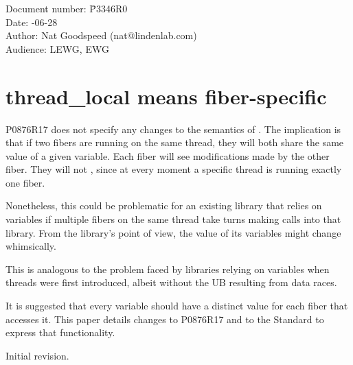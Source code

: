\documentclass[fontsize=10pt,paper=A4,pagesize,DIV=15]{scrartcl}
\begin{document}
\small
\begin{tabbing}
    Document number: \= P3346R0\\
    Date:            -06-28\\
    Author:          \> Nat Goodspeed (nat@lindenlab.com)\\
    Audience:        \> LEWG, EWG\\
\end{tabbing}

\section*{thread\_local means fiber-specific}


\tableofcontents


\label{abstract}

P0876R17\cite{P0876R17} does not specify any changes to the semantics of
. The implication is that
if two fibers are running on the same thread, they will both share the same
value of a given \tlocal variable. Each fiber will see modifications made by
the other fiber. They will not , since at every
moment a specific thread is running exactly one fiber.

Nonetheless, this could be problematic for an existing library that relies on
\tlocal variables if multiple fibers on the same thread take turns making
calls into that library. From the library's point of view, the value of its
\tlocal variables might change whimsically.

This is analogous to the problem faced by libraries relying on 
variables when threads were first introduced, albeit without the UB resulting
from data races.

It is suggested that every \tlocal variable should have a distinct value for
each fiber that accesses it. This paper details changes to P0876R17 and to
the Standard\cite{Standard} to express that functionality.

\label{history}
Initial revision.

\end{document}
